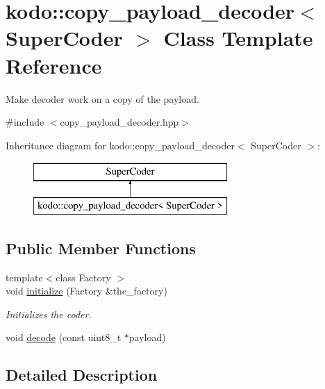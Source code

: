 \hypertarget{classkodo_1_1copy__payload__decoder}{\section{kodo\-:\-:copy\-\_\-payload\-\_\-decoder$<$ Super\-Coder $>$ Class Template Reference}
\label{classkodo_1_1copy__payload__decoder}
}


Make decoder work on a copy of the payload.  




{\ttfamily \#include $<$copy\-\_\-payload\-\_\-decoder.\-hpp$>$}

Inheritance diagram for kodo\-:\-:copy\-\_\-payload\-\_\-decoder$<$ Super\-Coder $>$\-:\begin{figure}[H]
\begin{center}
\leavevmode
\includegraphics[height=2.000000cm]{classkodo_1_1copy__payload__decoder}
\end{center}
\end{figure}
\subsection*{Public Member Functions}
\begin{DoxyCompactItemize}
\item 
{\footnotesize template$<$class Factory $>$ }\\void \hyperlink{classkodo_1_1copy__payload__decoder_aa25f10859841e441c62f397cee91f80b}{initialize} (Factory \&the\-\_\-factory)
\begin{DoxyCompactList}\small\item\em Initializes the coder. \end{DoxyCompactList}\item 
void \hyperlink{classkodo_1_1copy__payload__decoder_ac1bf5f2d18beb3111c28004138cf6042}{decode} (const uint8\-\_\-t $\ast$payload)
\begin{DoxyCompactList}\small\item\em \end{DoxyCompactList}\end{DoxyCompactItemize}


\subsection{Detailed Description}
